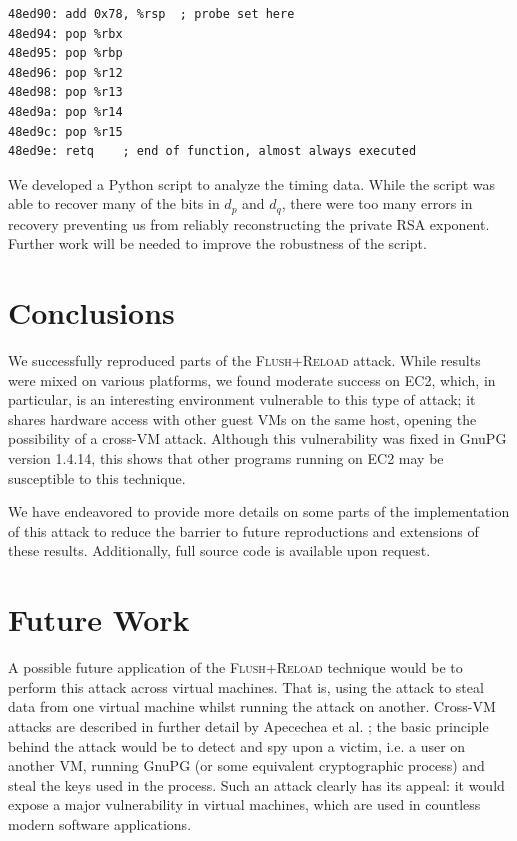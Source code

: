 \documentclass[11pt]{llncs}
\newcommand{\flushreload}{\textsc{Flush}+\textsc{Reload}}
\begin{document}
\begin{lstlisting}[language={[x86masm]Assembler},
    caption={A probe at \texttt{0x08ed90} near the end of
    \texttt{mpihelp\_divrem}, the modulus function, on EC2 hardware.},float=*]
48ed90: add 0x78, %rsp	; probe set here
48ed94: pop %rbx
48ed95: pop %rbp
48ed96: pop %r12
48ed98: pop %r13
48ed9a: pop %r14
48ed9c: pop %r15
48ed9e: retq	; end of function, almost always executed
\end{lstlisting}

We developed a Python script to analyze the timing data. While the script was
able to recover many of the bits in $d_p$ and $d_q$, there were too many errors
in recovery preventing us from reliably reconstructing the private RSA exponent.
Further work will be needed to improve the robustness of the script.

\section{Conclusions}

We successfully reproduced parts of the \flushreload{} attack. While results
were mixed on various platforms, we found moderate success on EC2, which, in
particular, is an interesting environment vulnerable to this type of attack;
it shares hardware access with other guest VMs on the same host, opening the
possibility of a cross-VM attack. Although this vulnerability was fixed in GnuPG
version 1.4.14, this shows that other programs running on EC2 may be susceptible
to this technique.

We have endeavored to provide more details on some parts of the implementation
of this attack to reduce the barrier to future reproductions and
extensions of these results. Additionally, full source code is available upon
request.

\section{Future Work}

A possible future application of the \flushreload{} technique would be to
perform this attack across virtual machines. That is, using the attack to steal
data from one virtual machine whilst running the attack on another. Cross-VM
attacks are described in further detail by Apecechea et al.
\cite{cryptoeprint:2014:248}; the basic principle behind the attack would be to
detect and spy upon a victim, i.e. a user on another VM, running GnuPG (or some
equivalent cryptographic process) and steal the keys used in the process. Such
an attack clearly has its appeal: it would expose a major vulnerability in
virtual machines, which are used in countless modern software applications.
\end{document}
